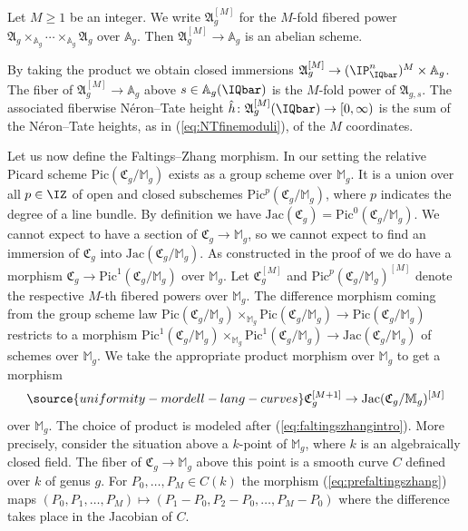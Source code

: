 Let $M\ge 1$ be an integer. We write $\mathfrak{A}_g^{[M]}$ for the
$M$-fold fibered power
$\mathfrak{A}_g\times_{\mathbb{A}_g} \cdots \times_{\mathbb{A}_g}\mathfrak{A}_g$
over $\mathbb{A}_g$.
Then $\mathfrak{A}_g^{[M]}\rightarrow \mathbb{A}_g$ is an abelian
scheme.


By taking the product we obtain closed
immersions $\mathfrak{A}_g^{[M]}\rightarrow (\IP_\IQbar^n)^{M}\times
\mathbb{A}_g$. The fiber of $\mathfrak{A}_g^{[M]}\rightarrow
\mathbb{A}_g$ above $s\in \mathbb{A}_g(\IQbar)$ is the $M$-fold power of
$\mathfrak{A}_{g,s}$. The associated fiberwise N\'eron--Tate height
$\hat h \colon \mathfrak{A}_g^{[M]}(\IQbar)\rightarrow [0,\infty)$ is
the sum of the N\'eron--Tate heights, as in (\ref{eq:NTfinemoduli}),
of the $M$ coordinates.%

Let us now define the Faltings--Zhang morphism.
In our setting the relative Picard scheme
$\mathrm{Pic}(\mathfrak{C}_g/\mathbb{M}_g)$ exists as a group scheme
over $\mathbb{M}_g$. It is a union over all $p\in\IZ$
of open and closed subschemes
$\mathrm{Pic}^p(\mathfrak{C}_g/\mathbb{M}_g)$, where $p$ indicates the
degree of a line bundle.
By definition we have
$\mathrm{Jac}(\mathfrak{C}_g) =
\mathrm{Pic}^0(\mathfrak{C}_g/\mathbb{M}_g)$.
We cannot expect to
have a section of $\mathfrak{C}_g\rightarrow\mathbb{M}_g$,
so we cannot expect to find an immersion of $\mathfrak{C}_g$
into $\mathrm{Jac}(\mathfrak{C}_g/\mathbb{M}_g)$.
As constructed in the proof of
\cite[Proposition~6.9]{MFK:GIT94} we
do have a morphism $\mathfrak{C}_g \rightarrow
\mathrm{Pic}^1(\mathfrak{C}_g/\mathbb{M}_g)$ over $\mathbb{M}_g$.
Let $\mathfrak{C}_g^{[M]}$ and
$\mathrm{Pic}^p(\mathfrak{C}_g/\mathbb{M}_g)^{[M]}$ denote the
respective $M$-th fibered powers over $\mathbb{M}_g$.
The difference morphism coming from the group scheme law
$\mathrm{Pic}(\mathfrak{C}_g/\mathbb{M}_g)\times_{\mathbb{M}_g}
\mathrm{Pic}(\mathfrak{C}_g/\mathbb{M}_g)\rightarrow
\mathrm{Pic}(\mathfrak{C}_g/\mathbb{M}_g)$ restricts to a morphism
$\mathrm{Pic}^1(\mathfrak{C}_g/\mathbb{M}_g)\times_{\mathbb{M}_g}
\mathrm{Pic}^1(\mathfrak{C}_g/\mathbb{M}_g)
\rightarrow
\mathrm{Jac}(\mathfrak{C}_g/\mathbb{M}_g)$ of schemes
over $\mathbb{M}_g$.
We take the appropriate  product morphism over $\mathbb{M}_g$ to get a
morphism
\begin{equation}
  \label{eq:prefaltingszhang}
\source{uniformity-mordell-lang-curves}
  \mathfrak{C}_g^{[M+1]} \rightarrow
 \mathrm{Jac}(\mathfrak{C}_g/\mathbb{M}_g)^{[M]}
\end{equation}
over $\mathbb{M}_g$. The choice of product is modeled after
(\ref{eq:faltingszhangintro}). More precisely, consider the situation
above a $k$-point of $\mathbb{M}_g$, where $k$ is an algebraically
closed field. The fiber of $\mathfrak{C}_g \rightarrow \mathbb{M}_g$ above this point is a smooth curve $C$
defined over $k$ of genus $g$. For $P_0,\ldots,P_M\in C(k)$ the
morphism (\ref{eq:prefaltingszhang}) maps $(P_0,P_1,\ldots,P_M)
\mapsto (P_1-P_0,P_2-P_0,\ldots,P_M-P_0)$ where the difference takes
place in the Jacobian of $C$. %

